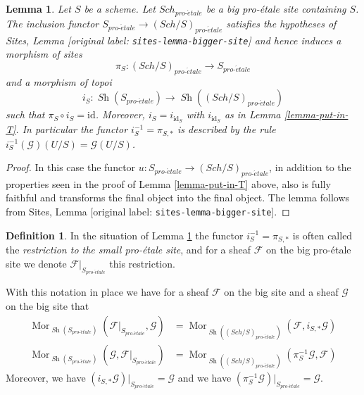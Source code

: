 \documentclass[10pt,a4paper]{article}
\theoremstyle{plain}
\newtheorem{lemma}[subsection]{Lemma}
\theoremstyle{definition}
\newtheorem{definition}[subsection]{Definition}
\theoremstyle{remark}
\numberwithin{equation}{subsection}
\def\Sch{\mathit{Sch}}
\def\Mor{\mathop{\mathrm{Mor}}\nolimits}
\def\Sh{\mathop{\mathit{Sh}}\nolimits}
\def\proetale{{pro\text{-}\acute{e}tale}}
\begin{document}
\begin{lemma}
\label{lemma-at-the-bottom}
Let $S$ be a scheme. Let $\Sch_\proetale$ be a big pro-\'etale
site containing $S$.
The inclusion functor $S_\proetale \to (\Sch/S)_\proetale$
satisfies the hypotheses of Sites, Lemma \textnormal{[original label: \nolinkurl{sites-lemma-bigger-site}]}
and hence induces a morphism of sites
$$
\pi_S : (\Sch/S)_\proetale \longrightarrow S_\proetale
$$
and a morphism of topoi
$$
i_S : \Sh(S_\proetale) \longrightarrow \Sh((\Sch/S)_\proetale)
$$
such that $\pi_S \circ i_S = \text{id}$. Moreover, $i_S = i_{\text{id}_S}$
with $i_{\text{id}_S}$ as in Lemma \ref{lemma-put-in-T}. In particular the
functor $i_S^{-1} = \pi_{S, *}$ is described by the rule
$i_S^{-1}(\mathcal{G})(U/S) = \mathcal{G}(U/S)$.
\end{lemma}

\begin{proof}
In this case the functor $u : S_\proetale \to (\Sch/S)_\proetale$,
in addition to the properties seen in the proof of
Lemma \ref{lemma-put-in-T} above, also is fully faithful
and transforms the final object into the final object.
The lemma follows from Sites, Lemma \textnormal{[original label: \nolinkurl{sites-lemma-bigger-site}]}.
\end{proof}

\begin{definition}
\label{definition-restriction-small-proetale}
In the situation of
Lemma \ref{lemma-at-the-bottom}
the functor $i_S^{-1} = \pi_{S, *}$ is often
called the {\it restriction to the small pro-\'etale site}, and for a sheaf
$\mathcal{F}$ on the big pro-\'etale site we denote
$\mathcal{F}|_{S_\proetale}$ this restriction.
\end{definition}

\noindent
With this notation in place we have for a sheaf $\mathcal{F}$ on the
big site and a sheaf $\mathcal{G}$ on the big site that
\begin{align*}
\Mor_{\Sh(S_\proetale)}(\mathcal{F}|_{S_\proetale}, \mathcal{G})
& =
\Mor_{\Sh((\Sch/S)_\proetale)}(\mathcal{F},
i_{S, *}\mathcal{G}) \\
\Mor_{\Sh(S_\proetale)}(\mathcal{G}, \mathcal{F}|_{S_\proetale})
& =
\Mor_{\Sh((\Sch/S)_\proetale)}(\pi_S^{-1}\mathcal{G}, \mathcal{F})
\end{align*}
Moreover, we have $(i_{S, *}\mathcal{G})|_{S_\proetale} = \mathcal{G}$
and we have $(\pi_S^{-1}\mathcal{G})|_{S_\proetale} = \mathcal{G}$.
\end{document}
